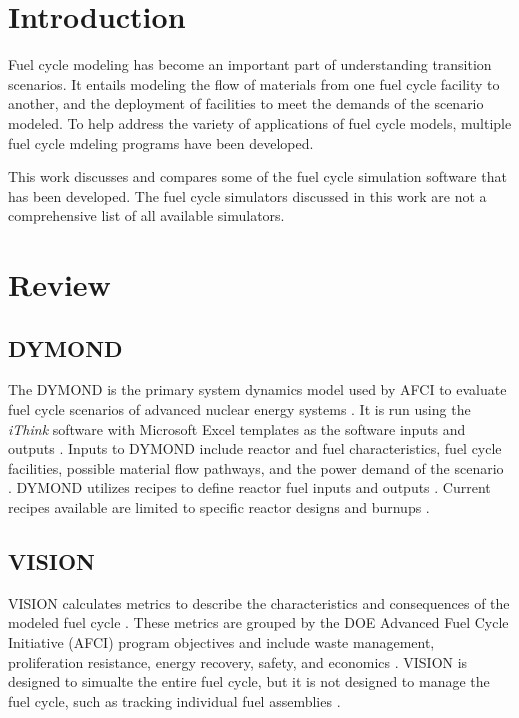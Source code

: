 \documentclass{article}
\begin{document}
    \section{Introduction}
    Fuel cycle modeling has become an important part of understanding 
    transition scenarios. It entails modeling the flow of materials 
    from one fuel cycle facility to another, and the deployment of 
    facilities to meet the demands of the scenario modeled. 
    To help address the variety of applications 
    of fuel cycle models, multiple fuel cycle mdeling programs have 
    been developed. 

    This work discusses and compares some of the fuel cycle simulation 
    software that has been developed. The fuel cycle simulators 
    discussed in this work are not a comprehensive list of all available 
    simulators. 
    

    \section{Review}
    
    
    \subsection{DYMOND}
    The \gls{DYMOND} is the primary 
    system dynamics model used by AFCI to evaluate fuel cycle scenarios of 
    advanced nuclear energy systems \cite{yacout_visionverifiable_2006}.
    It is run using the \textit{iThink} software with Microsoft Excel 
    templates as the software inputs and outputs \cite{feng_standardized_2016}.
    Inputs to DYMOND include reactor and fuel characteristics, fuel cycle
    facilities, possible material flow pathways, and the power demand of the 
    scenario \cite{feng_standardized_2016}. 
    \gls{DYMOND} utilizes recipes to define reactor fuel inputs and outputs 
    \cite{yacout_visionverifiable_2006}. Current recipes available are limited 
    to specific reactor designs and burnups \cite{yacout_visionverifiable_2006}.

    \subsection{VISION}
    \Ac{VISION} calculates metrics to describe the characteristics and 
    consequences of the modeled fuel cycle \cite{yacout_visionverifiable_2006}. 
    These metrics are grouped by the 
    \gls{DOE} Advanced Fuel Cycle Initiative (AFCI) program objectives and include 
    waste management, proliferation 
    resistance, energy recovery, safety, and economics 
    \cite{yacout_visionverifiable_2006}. \gls{VISION} is designed to simualte the 
    entire fuel cycle, but it is not designed to manage the fuel cycle, such 
    as tracking individual fuel assemblies \cite{yacout_visionverifiable_2006}.
\end{document}

